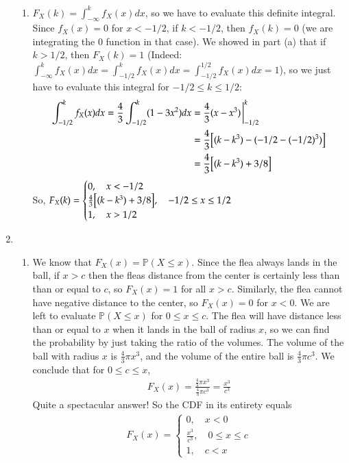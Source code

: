 \documentclass[12pt]{article}
\renewcommand{\P}{\mathbb{P}}
\begin{document}
\begin{enumerate}[leftmargin=\labelsep]
\begin{enumerate}
			\item $F_X(k) = \int_{-\infty}^k f_X(x)dx$, so we have to evaluate this definite integral. Since $f_X(x) = 0$ for $x < -1/2$, if $k < -1/2$, then $f_X(k) = 0$ (we are integrating the 0 function in that case). We showed in part (a) that if $k > 1/2$, then $F_X(k) = 1$ (Indeed: $\int_{-\infty}^k f_X(x)dx = \int_{-1/2}^k f_X(x)dx = \int_{-1/2}^{1/2} f_X(x)dx = 1$), so we just have to evaluate this integral for $-1/2 \leq k \leq 1/2$:
			\begin{align*}
				\int_{-1/2}^k f_X(x)dx = \frac43 \int_{-1/2}^k (1-3x^2)dx &= \frac43 (x-x^3)\eval_{-1/2}^k \\
				&= \frac43 \qty[(k-k^3)-(-1/2-(-1/2)^3)] \\
				&= \frac43 \qty[(k-k^3) + 3/8]
			\end{align*}
			So, $F_X(k) = \begin{cases}
				0, \quad x < -1/2 \\
				\frac43 \qty[(k-k^3)+3/8], \quad -1/2 \leq x \leq 1/2 \\
				1, \quad x > 1/2
			\end{cases}$
		\end{enumerate}
	
		\newpage
		\item
		\begin{enumerate}
			\item We know that $F_X(x) = \P(X \leq x)$. Since the flea always lands in the ball, if $x > c$ then the fleas distance from the center is certainly less than than or equal to $c$, so $F_X(x) = 1$ for all $x > c$. Similarly, the flea cannot have negative distance to the center, so $F_X(x) = 0$ for $x < 0$. We are left to evaluate $\P(X \leq x)$ for $0 \leq x \leq c$. The flea will have distance less than or equal to $x$ when it lands in the ball of radius $x$, so we can find the probability by just taking the ratio of the volumes. The volume of the ball with radius $x$ is $\frac43 \pi x^3$, and the volume of the entire ball is $\frac43 \pi c^3$. We conclude that for $0 \leq c \leq x$, \begin{align*}
				F_X(x) = \frac{\frac43 \pi x^3}{\frac43 \pi c^3} = \frac{x^3}{c^3}
			\end{align*}
			Quite a spectacular answer! So the CDF in its entirety equals
			\begin{align*}
				F_X(x) = \begin{cases}
					0, \quad x < 0 \\
					\frac{x^3}{c^3}, \quad 0 \leq x \leq c \\
					1, \quad c < x
				\end{cases}
			\end{align*}
		

\end{enumerate}
\end{enumerate}
\end{document}
